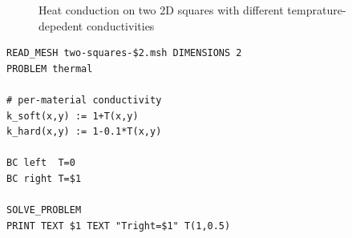 \documentclass[
  american,
]{article}
\begin{document}
\begin{figure}
\centering



\caption{Heat conduction on two 2D squares with different
temprature-depedent conductivities}

\label{fig:two-squares}

\end{figure}

\begin{lstlisting}[style=feenox]
READ_MESH two-squares-$2.msh DIMENSIONS 2
PROBLEM thermal

# per-material conductivity
k_soft(x,y) := 1+T(x,y)
k_hard(x,y) := 1-0.1*T(x,y)

BC left  T=0
BC right T=$1

SOLVE_PROBLEM
PRINT TEXT $1 TEXT "Tright=$1" T(1,0.5)
\end{lstlisting}
\end{document}
